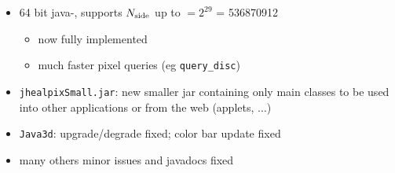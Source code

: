 \documentclass[12pt,twoside]{article}
\newcommand{\nside}{{N_{\rm side}}}
\begin{document}
{{%
\begin{itemize}
	\item 64 bit java-\healpix, supports $\nside$ up to $ = 2^{29}$ = 536870912
	\begin{itemize}
		\item now fully implemented
		\item much faster pixel queries (eg {\tt query\_disc})
	\end{itemize}
	\item {\tt jhealpixSmall.jar}: new smaller jar containing only main
classes to be used into other applications or from the web (applets, $\ldots$)
	\item {\tt Java3d}: upgrade/degrade fixed; color bar update fixed
	\item many others minor issues and javadocs fixed
\end{itemize}
}}
\end{document}
